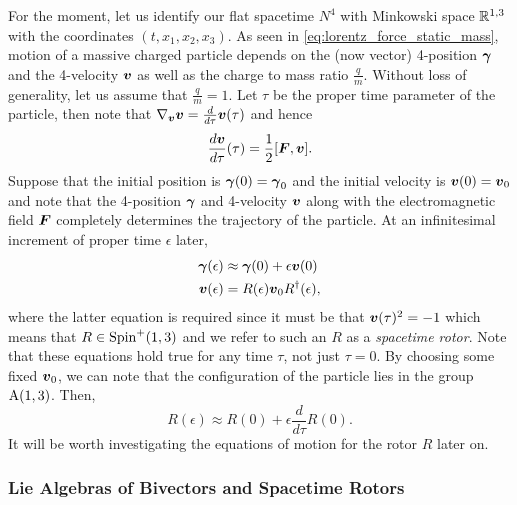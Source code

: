 \documentclass[conf]{new-aiaa}
\begin{document}
For the moment, let us identify our flat spacetime $N^4$ with Minkowski space $\mathbb{R}^{1,3}$ with the coordinates $(t,x_1,x_2,x_3)$. As seen in \cref{eq:lorentz_force_static_mass}, motion of a massive charged particle depends on the (now vector) 4-position $\boldsymbol{\gamma}$ and the 4-velocity $\boldsymbol{v}$ as well as the charge to mass ratio $\frac{q}{m}$. Without loss of generality, let us assume that $\frac{q}{m}=1$. Let $\tau$ be the proper time parameter of the particle, then note that $\nabla_{\boldsymbol{v}}\boldsymbol{v}=\frac{d}{d\tau} \boldsymbol{v}(\tau)$ and hence
\begin{equation}
    \label{eq:faraday_transport}
    \frac{d\boldsymbol{v}}{d\tau} (\tau) = \frac{1}{2} [\boldsymbol{F},\boldsymbol{v}].
\end{equation}
Suppose that the initial position is $\boldsymbol{\gamma}(0)=\boldsymbol{\gamma}_0$ and the initial velocity is $\boldsymbol{v}(0)=\boldsymbol{v}_0$ and note that the 4-position $\boldsymbol{\gamma}$ and 4-velocity  $\boldsymbol{v}$ along with the electromagnetic field $\boldsymbol{F}$ completely determines the trajectory of the particle. At an infinitesimal increment of proper time $\epsilon$ later,
\begin{align}
\label{eq:linearization_position}
\boldsymbol{\gamma}(\epsilon) &\approx \boldsymbol{\gamma}(0)+\epsilon\boldsymbol{v}(0)\\
\boldsymbol{v}(\epsilon) &=  R(\epsilon)\boldsymbol{v}_0 R^\dagger(\epsilon),
\end{align}
where the latter equation is required since it must be that $\boldsymbol{v}(\tau)^2=-1$ which means that $R\in \operatorname{Spin}^+(1,3)$ and we refer to such an $R$ as a \emph{spacetime rotor}. Note that these equations hold true for any time $\tau$, not just $\tau = 0$. By choosing some fixed $\boldsymbol{v}_0$, we can note that the configuration of the particle lies in the group $\operatorname{A}(1,3)$. Then, 
\begin{equation}
\label{eq:linearization_rotor}
R(\epsilon) \approx R(0)+\epsilon\frac{d}{d\tau}R(0).
\end{equation}
It will be worth investigating the equations of motion for the rotor $R$ later on.



\subsubsection{Lie Algebras of Bivectors and Spacetime Rotors}
\end{document}
